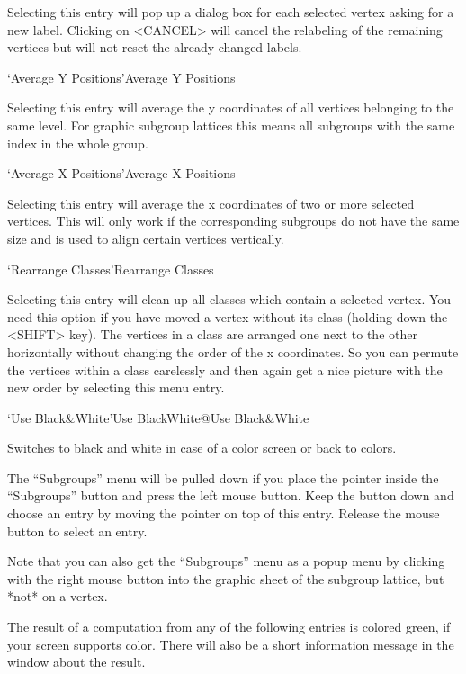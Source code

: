 Selecting  this entry will pop  up a dialog  box for each selected vertex
asking for a new label.  Clicking on <CANCEL>  will cancel the relabeling
of the remaining vertices but will not reset the already changed labels.

\>`Average Y Positions'{Average Y Positions}

Selecting this entry will average the y coordinates of all vertices
belonging to the same level. For graphic subgroup lattices this means all
subgroups with the same index in the whole group.

\>`Average X Positions'{Average X Positions}

Selecting this entry  will  average the x   coordinates  of two or   more
selected vertices.  This will only work if the corresponding subgroups do
not have the same size and is used to align certain vertices
vertically.

\>`Rearrange Classes'{Rearrange Classes}

Selecting this entry will clean up all classes which contain a selected
vertex. You need this option if you have moved a vertex without its class
(holding down the <SHIFT> key). The vertices in a class are arranged one
next to the other horizontally without changing the order of the x
coordinates. So you can permute the vertices within a class carelessly and
then again get a nice picture with the new order by selecting this menu
entry.

\>`Use Black\&White'{Use BlackWhite}@{Use Black\&White}

Switches to black and white in case of a color screen or back to colors.



The ``Subgroups'' menu will be pulled down  if you place the pointer inside
the ``Subgroups'' button and press the left mouse  button.  Keep the button
down and choose an entry   by moving the pointer  on  top of this  entry.
Release the mouse button to select an entry.

Note that you can also get the ``Subgroups'' menu as a popup menu by
clicking with the right mouse button into the graphic sheet of the subgroup
lattice, but *not* on a vertex.

The result   of a computation from   any of the  following  entries is
colored green, if your screen supports color.  There will also be a short
information message in the {\GAP} window about the result.

